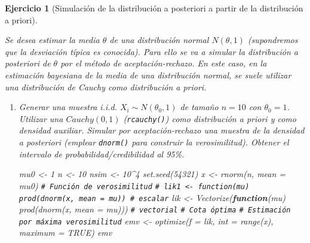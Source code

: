 \documentclass[
  10pt,
]{book}
\newenvironment{Shaded}{\begin{snugshade}}{\end{snugshade}}
\newcommand{\AttributeTok}[1]{\textcolor[rgb]{0.77,0.63,0.00}{#1}}
\newcommand{\CommentTok}[1]{\textcolor[rgb]{0.56,0.35,0.01}{\textit{#1}}}
\newcommand{\ConstantTok}[1]{\textcolor[rgb]{0.00,0.00,0.00}{#1}}
\newcommand{\ControlFlowTok}[1]{\textcolor[rgb]{0.13,0.29,0.53}{\textbf{#1}}}
\newcommand{\DecValTok}[1]{\textcolor[rgb]{0.00,0.00,0.81}{#1}}
\newcommand{\FunctionTok}[1]{\textcolor[rgb]{0.00,0.00,0.00}{#1}}
\newcommand{\NormalTok}[1]{#1}
\newcommand{\OtherTok}[1]{\textcolor[rgb]{0.56,0.35,0.01}{#1}}
\newcommand{\SpecialCharTok}[1]{\textcolor[rgb]{0.00,0.00,0.00}{#1}}
\theoremstyle{break}
\newtheorem{exercise}{Ejercicio}[chapter]
\theoremstyle{nonumberplain}
\renewcommand{\CommentTok}[1]{\textcolor[rgb]{0.41,0.41,0.41}{\texttt{#1}}}
\begin{document}
\begin{exercise}[Simulación de la distribución a posteriori a partir de la distribución a priori]
\protect\hypertarget{exr:post-pri-ar}{}\label{exr:post-pri-ar}

Se desea estimar la media \(\theta\) de una distribución normal \(N(\theta, 1)\) (supondremos que la desviación típica es conocida).
Para ello se va a simular la distribución a posteriori de \(\theta\) por el método de aceptación-rechazo.
En este caso, en la estimación bayesiana de la media de una distribución normal, se suele utilizar una distribución de Cauchy como distribución a priori.

\begin{enumerate}
\def\labelenumi{\alph{enumi})}
\item
  Generar una muestra i.i.d. \(X_{i}\sim N(\theta_{0},1)\) de tamaño
  \(n=10\) con \(\theta_{0}=1\). Utilizar una \(Cauchy(0,1)\)
  (\texttt{rcauchy()}) como distribución a priori y como densidad auxiliar.
  Simular por aceptación-rechazo una muestra de la densidad a
  posteriori (emplear \texttt{dnorm()} para construir la verosimilitud).
  Obtener el intervalo de probabilidad/credibilidad al 95\%.

\begin{Shaded}
\begin{Highlighting}[]
\NormalTok{mu0 }\OtherTok{\textless{}{-}} \DecValTok{1}
\NormalTok{n }\OtherTok{\textless{}{-}} \DecValTok{10}
\NormalTok{nsim }\OtherTok{\textless{}{-}} \DecValTok{10}\SpecialCharTok{\^{}}\DecValTok{4}
\FunctionTok{set.seed}\NormalTok{(}\DecValTok{54321}\NormalTok{)}
\NormalTok{x }\OtherTok{\textless{}{-}} \FunctionTok{rnorm}\NormalTok{(n, }\AttributeTok{mean =}\NormalTok{ mu0)}
\CommentTok{\# Función de verosimilitud}
\CommentTok{\# lik1 \textless{}{-} function(mu) prod(dnorm(x, mean = mu)) \# escalar}
\NormalTok{lik }\OtherTok{\textless{}{-}} \FunctionTok{Vectorize}\NormalTok{(}\ControlFlowTok{function}\NormalTok{(mu) }\FunctionTok{prod}\NormalTok{(}\FunctionTok{dnorm}\NormalTok{(x, }\AttributeTok{mean =}\NormalTok{ mu))) }\CommentTok{\# vectorial}
\CommentTok{\# Cota óptima}
\CommentTok{\# Estimación por máxima verosimilitud}
\NormalTok{emv }\OtherTok{\textless{}{-}} \FunctionTok{optimize}\NormalTok{(}\AttributeTok{f =}\NormalTok{ lik, }\AttributeTok{int =} \FunctionTok{range}\NormalTok{(x), }\AttributeTok{maximum =} \ConstantTok{TRUE}\NormalTok{)}
\NormalTok{emv}
\end{Highlighting}
\end{Shaded}


\end{enumerate}
\end{exercise}
\end{document}
